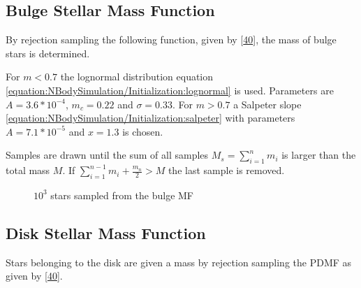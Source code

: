 \documentclass[letterpaper,10pt,english]{sphinxmanual}
\begin{document}
\subsection{Bulge Stellar Mass Function}
\label{\detokenize{NBodySimulation/Initialization:bulge-stellar-mass-function}}
\sphinxAtStartPar
By rejection sampling the following function, given by {[}\hyperlink{cite.NBodySimulation/Appendix:id2}{40}{]}, the mass of bulge stars is determined.

\sphinxAtStartPar
For \(m<0.7\) the log\sphinxhyphen{}normal distribution equation \eqref{equation:NBodySimulation/Initialization:lognormal} is used. Parameters are \(A=3.6*10^{-4}\), \(m_{c}=0.22\) and \(\sigma=0.33\).
For \(m>0.7\) a Salpeter slope \eqref{equation:NBodySimulation/Initialization:salpeter} with parameters \(A=7.1*10^{-5}\) and \(x=1.3\) is chosen.

\sphinxAtStartPar
Samples are drawn until the sum of all samples \(M_s = \sum_{i=1}^n m_i\) is larger than the total mass \(M\).
If \(\sum_{i=1}^{n-1} m_i +\frac{m_n}{2} > M\) the last sample is removed.

\begin{figure}[htbp]
\centering
\capstart

\noindent{}
\caption{\(10^3\) stars sampled from the bulge MF}\label{\detokenize{NBodySimulation/Initialization:id43}}\label{\detokenize{NBodySimulation/Initialization:fig-initial-conditions-mass-bulge}}\end{figure}


\subsection{Disk Stellar Mass Function}
\label{\detokenize{NBodySimulation/Initialization:disk-stellar-mass-function}}
\sphinxAtStartPar
Stars belonging to the disk are given a mass by rejection sampling the PDMF as given by {[}\hyperlink{cite.NBodySimulation/Appendix:id2}{40}{]}.
\end{document}
